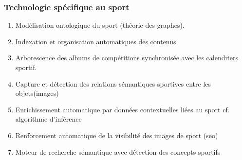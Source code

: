 \subsubsection {Technologie spécifique au sport}{}
\begin{enumerate}
\item Modélisation ontologique du sport (théorie des graphes). 
\item Indexation et organisation automatiques des contenus 
\item Arborescence des albums de compétitions synchronisée avec les calendriers sportif.
\item Capture et détection des relations sémantiques sportives entre les objets(images)
\item Enrichissement automatique par données contextuelles liées au sport cf. algorithme d’inférence 
\item Renforcement automatique de la visibilité des images de sport (seo)
\item Moteur de recherche sémantique avec détection des concepts sportifs 
\end{enumerate}












